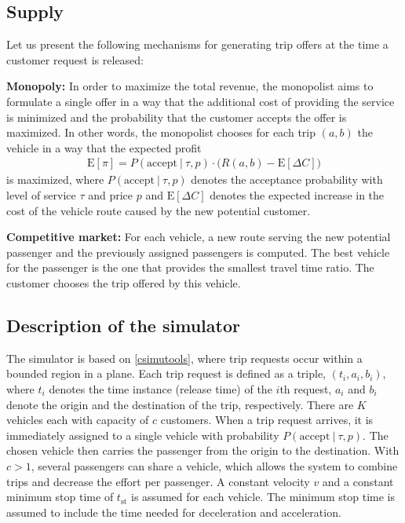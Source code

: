 \documentclass[dissertation,draft*]{aaltoseries}
\newcommand{\E}[1]{\mathrm{E}[ #1 ]}
\begin{document}
\subsection{Supply}
\label{dailydecisions}
Let us present the following mechanisms for generating trip offers at the time a customer request is released: 

\textbf{Monopoly:} In order to maximize the total revenue, the monopolist aims to formulate a single offer in a way that the additional cost of providing the service is minimized and the probability that the customer accepts the offer is maximized. In other words, the monopolist chooses for each trip $(a,b)$ the vehicle in a way that the expected profit
\begin{align}
\label{dailymonopoly}
\E{\pi}=P(\mbox{accept} \ | \ \tau, p) \cdot \Big( R(a,b)-\E{\Delta C} \Big)
\end{align}
is maximized, where $P(\mbox{accept} \ | \ \tau, p)$ denotes the acceptance probability with level of service $\tau$ and price $p$ and 
$\E{\Delta C}$ denotes the expected increase in the cost of the vehicle route caused by the new potential customer.

\textbf{Competitive market:}
For each vehicle,
a new route serving the new potential passenger and the previously assigned passengers
is computed. The best vehicle for the passenger is the one that
provides the smallest travel time ratio. The customer chooses the trip offered by this vehicle.


\subsection{Description of the simulator}
The simulator is based on \ref{csimutools}, where trip requests occur within a bounded region in a plane. Each trip request is defined as a triple, $(t_i, a_i,b_i)$, where $t_i$ denotes the time instance (release time) of the $i$th request, $a_i$ and $b_i$ denote the origin and the destination of the trip, respectively.
There are $K$ vehicles each with capacity of $c$ customers. When a trip request arrives, it is immediately assigned to a single vehicle with probability $P(\mbox{accept} \ | \ \tau,p)$. The chosen vehicle then carries the passenger from the origin to the destination. With $c>1$, several passengers can share a vehicle, which allows the system to combine trips and decrease the effort per passenger.
A constant velocity $v$ and a constant minimum stop time of $t_{\mbox{st}}$ is assumed for each vehicle. The minimum stop time is assumed to include the time needed for deceleration and acceleration. 
\end{document}
